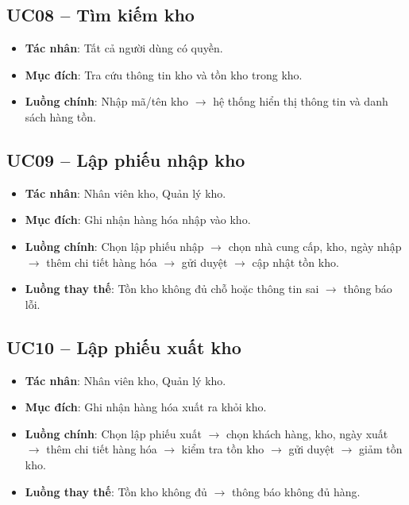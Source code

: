 \subsection{UC08 -- Tìm kiếm kho}

\begin{itemize}[leftmargin=1.5cm]
    \item \textbf{Tác nhân}: Tất cả người dùng có quyền.
    \item \textbf{Mục đích}: Tra cứu thông tin kho và tồn kho trong kho.
    \item \textbf{Luồng chính}: Nhập mã/tên kho $\rightarrow$ hệ thống hiển thị thông tin và danh sách hàng tồn.
\end{itemize}

\subsection{UC09 -- Lập phiếu nhập kho}

\begin{itemize}[leftmargin=1.5cm]
    \item \textbf{Tác nhân}: Nhân viên kho, Quản lý kho.
    \item \textbf{Mục đích}: Ghi nhận hàng hóa nhập vào kho.
    \item \textbf{Luồng chính}: Chọn lập phiếu nhập $\rightarrow$ chọn nhà cung cấp, kho, ngày nhập $\rightarrow$ thêm chi tiết hàng hóa $\rightarrow$ gửi duyệt $\rightarrow$ cập nhật tồn kho.
    \item \textbf{Luồng thay thế}: Tồn kho không đủ chỗ hoặc thông tin sai $\rightarrow$ thông báo lỗi.
\end{itemize}

\subsection{UC10 -- Lập phiếu xuất kho}

\begin{itemize}[leftmargin=1.5cm]
    \item \textbf{Tác nhân}: Nhân viên kho, Quản lý kho.
    \item \textbf{Mục đích}: Ghi nhận hàng hóa xuất ra khỏi kho.
    \item \textbf{Luồng chính}: Chọn lập phiếu xuất $\rightarrow$ chọn khách hàng, kho, ngày xuất $\rightarrow$ thêm chi tiết hàng hóa $\rightarrow$ kiểm tra tồn kho $\rightarrow$ gửi duyệt $\rightarrow$ giảm tồn kho.
    \item \textbf{Luồng thay thế}: Tồn kho không đủ $\rightarrow$ thông báo không đủ hàng.
\end{itemize}

